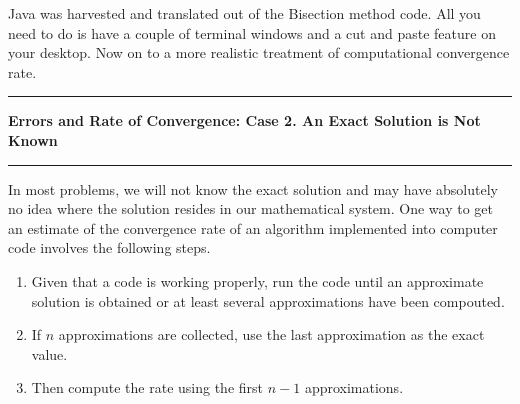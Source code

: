 \documentclass[10pt,fleqn]{article}
\begin{document}
Java was harvested and translated out of the Bisection method code. All you need
to do is have a couple of terminal windows and a cut and paste feature on your
desktop. Now on to a more realistic treatment of computational convergence rate.
\newpage
\vskip0.1in\hrule\vskip0.1in
\noindent
{\bf Errors and Rate of Convergence: Case 2. An Exact Solution is Not Known}
\vskip0.1in\hrule\vskip0.1in
In most problems, we will not know the exact solution and may have absolutely
no idea where the solution resides in our mathematical system. One way to get
an estimate of the convergence rate of an algorithm implemented into computer
code involves the following steps.

\begin{enumerate}
  \item Given that a code is working properly, run the code until an approximate
        solution is obtained or at least several approximations have been
        compouted.
  \item If $n$ approximations are collected, use the last approximation as the
        exact value.
  \item Then compute the rate using the first $n-1$ approximations.
\end{enumerate}
\end{document}
